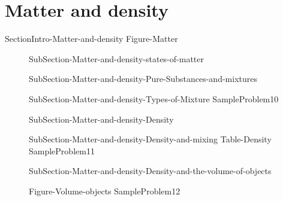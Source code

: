 \documentclass[main.tex]{subfiles}
\begin{document}
\section{Matter and density}
{SectionIntro-Matter-and-density}
{Figure-Matter}		
\sloppy\begin{description}
\item[] {SubSection-Matter-and-density-states-of-matter}
\item[]{SubSection-Matter-and-density-Pure-Substances-and-mixtures}
\item[]{SubSection-Matter-and-density-Types-of-Mixture}
{SampleProblem10}
\item[]{SubSection-Matter-and-density-Density}
\item[]{SubSection-Matter-and-density-Density-and-mixing}
{Table-Density} 
{SampleProblem11}
\item[]{SubSection-Matter-and-density-Density-and-the-volume-of-objects}

{Figure-Volume-objects}
{SampleProblem12}
\end{description}
\clearpage\thispagestyle{empty}\mbox{}\clearpage
\end{document}
